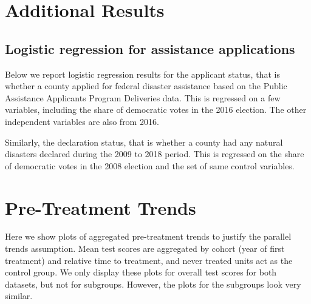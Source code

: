 
\section{Additional Results} \label{AppendixA}

\subsection{Logistic regression for assistance applications}

Below we report logistic regression results for the applicant status, that is whether a county applied for federal disaster assistance based on the Public Assistance Applicants Program Deliveries data. This is regressed on a few variables, including the share of democratic votes in the 2016 election. The other independent variables are also from 2016.

Similarly, the declaration status, that is whether a county had any natural disasters declared during the 2009 to 2018 period. This is regressed on the share of democratic votes in the 2008 election and the set of same control variables.




\section{Pre-Treatment Trends} \label{PreTrends}

Here we show plots of aggregated pre-treatment trends to justify the parallel trends assumption. Mean test scores are aggregated by cohort (year of first treatment) and relative time to treatment, and never treated units act as the control group. We only display these plots for overall test scores for both datasets, but not for subgroups. However, the plots for the subgroups look very similar.

